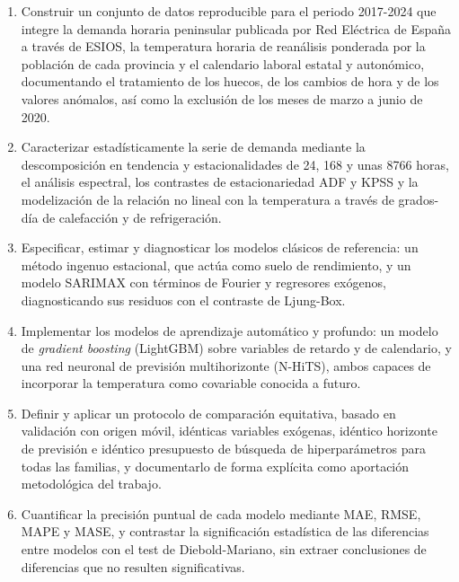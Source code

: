 \begin{enumerate}
	
	\item[\textbf{OE1.}] Construir un conjunto de datos reproducible para el
	periodo 2017-2024 que integre la demanda horaria peninsular publicada por
	Red Eléctrica de España a través de ESIOS, la temperatura horaria de
	reanálisis ponderada por la población de cada provincia y el calendario
	laboral estatal y autonómico, documentando el tratamiento de los huecos, de
	los cambios de hora y de los valores anómalos, así como la exclusión de los
	meses de marzo a junio de 2020.
	
	\item[\textbf{OE2.}] Caracterizar estadísticamente la serie de demanda
	mediante la descomposición en tendencia y estacionalidades de 24, 168 y
	unas 8766 horas, el análisis espectral, los contrastes de estacionariedad ADF y KPSS y
	la modelización de la relación no lineal con la temperatura a través de
	grados-día de calefacción y de refrigeración.
	
	\item[\textbf{OE3.}] Especificar, estimar y diagnosticar los modelos
	clásicos de referencia: un método ingenuo estacional, que actúa como suelo de
	rendimiento, y un modelo SARIMAX con términos de Fourier y regresores
	exógenos, diagnosticando sus residuos con el contraste de
	Ljung-Box.
	
	\item[\textbf{OE4.}] Implementar los modelos de aprendizaje automático y
	profundo: un modelo de \textit{gradient boosting} (LightGBM) sobre variables
	de retardo y de calendario, y una red neuronal de previsión multihorizonte
	(N-HiTS), ambos capaces de incorporar la temperatura como covariable conocida
	a futuro.
	
	\item[\textbf{OE5.}] Definir y aplicar un protocolo de comparación
	equitativa, basado en validación con origen móvil, idénticas variables
	exógenas, idéntico horizonte de previsión e idéntico presupuesto de búsqueda
	de hiperparámetros para todas las familias, y documentarlo de forma explícita
	como aportación metodológica del trabajo.
	
	\item[\textbf{OE6.}] Cuantificar la precisión puntual de cada modelo mediante
	MAE, RMSE, MAPE y MASE, y contrastar la significación estadística de las
	diferencias entre modelos con el test de Diebold-Mariano, sin extraer
	conclusiones de diferencias que no resulten significativas.
	

\end{enumerate}

